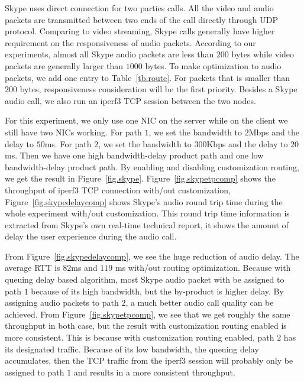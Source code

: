 Skype uses direct connection for two parties calls. All the video and audio packets are transmitted between two ends of the call directly through UDP protocol. Comparing to video streaming, Skype calls generally have higher requirement on the responsiveness of audio packets. According to our experiments, almost all Skype audio packets are less than $200$ bytes while video packets are generally larger than $1000$ bytes. To make optimization to audio packets, we add one entry to Table~\ref{tb.route}. For packets that is smaller than $200$ bytes, responsiveness consideration will be the first priority. Besides a Skype audio call, we also run an iperf3 TCP session between the two nodes.

For this experiment, we only use one NIC on the server while on the client we still have two NICs working. For path $1$, we set the bandwidth to $2$Mbps and the delay to $50$ms. For path $2$, we set the bandwidth to $300$Kbps and the delay to $20$ms. Then we have one high bandwidth-delay product path and one low bandwidth-delay product path. By enabling and disabling customization routing, we get the result in Figure~\ref{fig.skype}. Figure~\ref{fig.skypetpcomp} shows the throughput of iperf3 TCP connection with/out customization, Figure~\ref{fig.skypedelaycomp} shows Skype's audio round trip time during the whole experiment with/out customization. This round trip time information is extracted from Skype's own real-time technical report, it shows the amount of delay the user experience during the audio call. 

From Figure~\ref{fig.skypedelaycomp}, we see the huge reduction of audio delay. The average RTT is $82$ms and $119$ ms with/out routing optimization. Because with queuing delay based algorithm, most Skype audio packet with be assigned to path $1$ because of its high bandwidth, but the by-product is higher delay. By assigning audio packets to path $2$, a much better audio call quality can be achieved. From Figure~\ref{fig.skypetpcomp}, we see that we get roughly the same throughput in both case, but the result with customization routing enabled is more consistent. This is because with customization routing enabled, path $2$ has its designated traffic. Because of its low bandwidth, the queuing delay accumulates, then the TCP traffic from the iperf3 session will probably only be assigned to path $1$ and results in a more consistent throughput.

